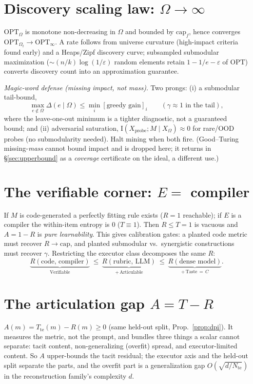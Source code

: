 \documentclass[11pt]{article}
\newcommand{\Iv}{\mathrm{I}}
\newcommand{\Om}{\Omega}
\newcommand{\te}{\mathrm{te}}
\begin{document}
\section{Discovery scaling law: $\Om\to\infty$}\label{sec:scaling}
$\mathrm{OPT}_\Om$ is monotone non-decreasing in $\Om$ and bounded by $\mathrm{cap}_f$, hence converges
$\mathrm{OPT}_{\Om_t}\to\mathrm{OPT}_\infty$. A rate follows from universe curvature (high-impact criteria
found early) and a Heaps/Zipf discovery curve; subsampled submodular maximization
($\sim(n/k)\log(1/\varepsilon)$ random elements retain $1-1/e-\varepsilon$ of $\mathrm{OPT}$) converts
discovery count into an approximation guarantee.

\emph{Magic-word defense (missing \emph{impact}, not mass).} Two prongs: (i) a submodular tail-bound,
\[
\max_{e\notin\Om}\Delta(e\mid\Om)\le\min_i[\text{greedy gain}]_i\qquad(\gamma\approx1\text{ in the tail}),
\]
where the leave-one-out minimum is a tighter diagnostic, not a guaranteed bound; and (ii) adversarial
saturation, $\Iv(X_{\mathrm{probe}};M\mid X_\Om)\approx0$ for rare/OOD probes (no submodularity needed).
Halt mining when both fire. (Good--Turing missing-\emph{mass} cannot bound impact and is dropped here; it
returns in \S\ref{sec:upperbound} as a \emph{coverage} certificate on the ideal, a different use.)

\section{The verifiable corner: $E=$ compiler}\label{sec:vcorner}
If $M$ is code-generated a perfectly fitting rule exists ($R=1$ reachable); if $E$ is a compiler the
within-item entropy is $0$ ($T\equiv1$). Then $R\le T=1$ is vacuous and $A=1-R$ is \emph{pure
learnability}. This gives calibration gates: a planted code metric must recover $R\to\mathrm{cap}$, and
planted submodular vs.\ synergistic constructions must recover $\gamma$. Restricting the executor class
decomposes the same $R$:
\[
\underbrace{R(\text{code, compiler})}_{\text{Verifiable}}\ \le\
\underbrace{R(\text{rubric, LLM})}_{+\,\text{Articulable}}\ \le\
\underbrace{R(\text{dense model})}_{+\,\text{Taste}\,=\,C}.
\]

\section{The articulation gap $A=T-R$}\label{sec:gap}
$A(m)=T_\te(m)-R(m)\ge0$ (same held-out split, Prop.~\ref{prop:dpi}). It measures the metric, not the
prompt, and bundles three things a scalar cannot separate: tacit content, non-generalizing (overfit)
spread, and executor-limited content. So $A$ upper-bounds the tacit residual; the executor axis and the
held-out split separate the parts, and the overfit part is a generalization gap
$O(\sqrt{d/N_\te})$ in the reconstruction family's complexity $d$.
\end{document}
